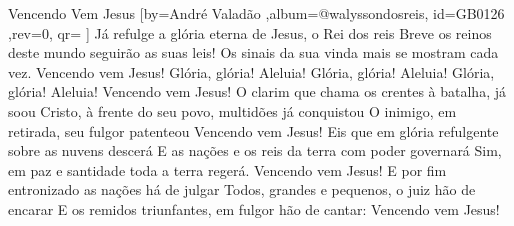 \beginsong
{Vencendo Vem Jesus %
}[by={André Valadão %
},album={@walyssondosreis},
id={GB0126 %
},rev={0}, %
qr={ %
}]
\beginverse*
Já refulge a glória eterna de Jesus, o Rei dos reis
Breve os reinos deste mundo seguirão as suas leis!
Os sinais da sua vinda mais se mostram cada vez.
Vencendo vem Jesus!
\endverse
\beginchorus
Glória, glória! Aleluia!
Glória, glória! Aleluia!
Glória, glória! Aleluia!
Vencendo vem Jesus!
\endchorus
\beginverse*
O clarim que chama os crentes à batalha, já soou
Cristo, à frente do seu povo, multidões já conquistou
O inimigo, em retirada, seu fulgor patenteou
Vencendo vem Jesus!
\endverse
\beginverse*
Eis que em glória refulgente sobre as nuvens descerá
E as nações e os reis da terra com poder governará
Sim, em paz e santidade toda a terra regerá.
Vencendo vem Jesus!
\endverse
\beginverse*
E por fim entronizado as nações há de julgar
Todos, grandes e pequenos, o juiz hão de encarar
E os remidos triunfantes, em fulgor hão de cantar:
Vencendo vem Jesus!
\endverse

